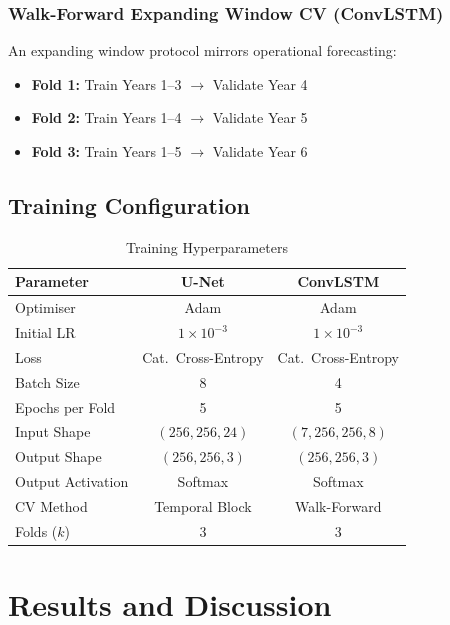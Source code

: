 \documentclass[conference]{IEEEtran}
\begin{document}
\subsubsection{Walk-Forward Expanding Window CV (ConvLSTM)}
An expanding window protocol mirrors operational forecasting:
\begin{itemize}
    \item \textbf{Fold 1:} Train Years 1--3 $\to$ Validate Year 4
    \item \textbf{Fold 2:} Train Years 1--4 $\to$ Validate Year 5
    \item \textbf{Fold 3:} Train Years 1--5 $\to$ Validate Year 6
\end{itemize}

\subsection{Training Configuration}

\begin{table}[htbp]
\caption{Training Hyperparameters}
\label{tab:training_config}
\centering
\footnotesize
\begin{tabular}{lcc}
\toprule
\textbf{Parameter} & \textbf{U-Net} & \textbf{ConvLSTM}\\
\midrule
Optimiser              & Adam & Adam\\
Initial LR             & $1 \times 10^{-3}$ & $1 \times 10^{-3}$\\
Loss                   & Cat.\ Cross-Entropy & Cat.\ Cross-Entropy\\
Batch Size             & 8 & 4\\
Epochs per Fold        & 5 & 5\\
Input Shape            & $(256,256,24)$ & $(7,256,256,8)$\\
Output Shape           & $(256,256,3)$ & $(256,256,3)$\\
Output Activation      & Softmax & Softmax\\
CV Method              & Temporal Block & Walk-Forward\\
Folds ($k$)            & 3 & 3\\
\bottomrule
\end{tabular}
\end{table}

\section{Results and Discussion}
\end{document}
